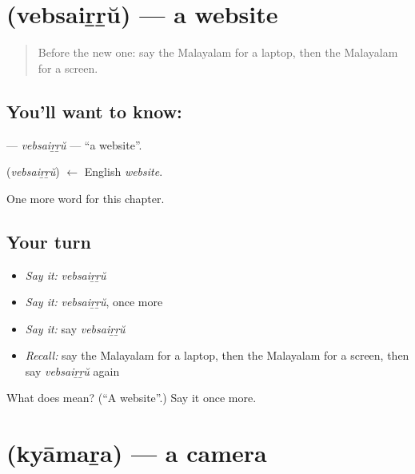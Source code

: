 \section[\texorpdfstring{\ml{വെബ്സൈറ്റ്} (vebsaiṟṟŭ)}{വെബ്സൈറ്റ് (vebsaiṟṟŭ)}]{ (vebsaiṟṟŭ) — a website}

\label{lesson:ML-C255-vebsairru}



\begin{quote}
Before the new one: say the Malayalam for a laptop, then the Malayalam for a screen.
\end{quote}

\subsection*{You'll want to know: }
\textbf{} — \emph{vebsaiṟṟŭ} — \textquotedblleft{}a website\textquotedblright{}.

\begin{cousinweb}
\textbf{} (\emph{vebsaiṟṟŭ}) $\leftarrow$ English \emph{website}.
\end{cousinweb}

\begin{grammarlens}[title={What you've built}]
One more word for this chapter.
\end{grammarlens}

\subsection*{Your turn}
\begin{itemize}
\raggedright
  \item \emph{Say it:} \emph{vebsaiṟṟŭ}
  \item \emph{Say it:} \emph{vebsaiṟṟŭ}, once more
  \item \emph{Say it:} say \emph{vebsaiṟṟŭ}
  \item \emph{Recall:} say the Malayalam for a laptop, then the Malayalam for a screen, then say \emph{vebsaiṟṟŭ} again
\end{itemize}

\begin{tcolorbox}[breakable,colback=teal!4,colframe=teal!35!black,title={Before you move on}]
What does  mean? (\textquotedblleft{}A website\textquotedblright{}.) Say it once more.
\end{tcolorbox}
\section[\texorpdfstring{\ml{ക്യാമറ} (kyāmaṟa)}{ക്യാമറ (kyāmaṟa)}]{ (kyāmaṟa) — a camera}

